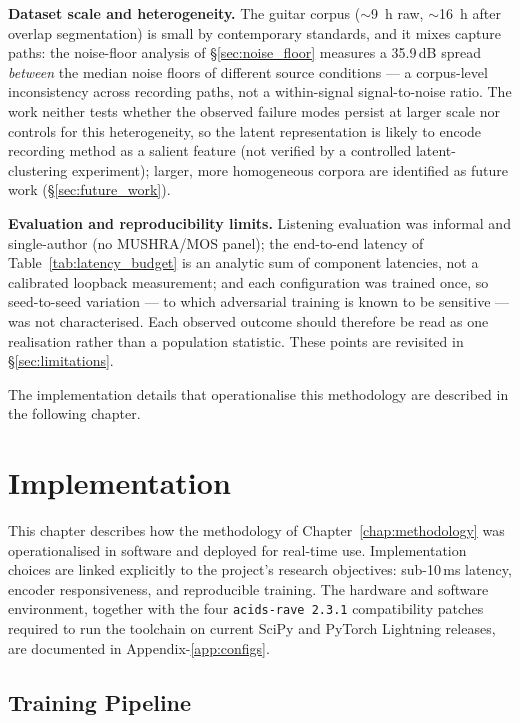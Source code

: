 \documentclass[a4paper,11pt,oneside,openany]{book}
\begin{document}
\textbf{Dataset scale and heterogeneity.} The guitar corpus ($\sim$9~h raw, $\sim$16~h after overlap segmentation) is small by contemporary standards, and it mixes capture paths: the noise-floor analysis of \S\ref{sec:noise_floor} measures a 35.9\,dB spread \emph{between} the median noise floors of different source conditions --- a corpus-level inconsistency across recording paths, not a within-signal signal-to-noise ratio. The work neither tests whether the observed failure modes persist at larger scale nor controls for this heterogeneity, so the latent representation is likely to encode recording method as a salient feature (not verified by a controlled latent-clustering experiment); larger, more homogeneous corpora are identified as future work (\S\ref{sec:future_work}).

\textbf{Evaluation and reproducibility limits.} Listening evaluation was informal and single-author (no MUSHRA/MOS panel); the end-to-end latency of Table~\ref{tab:latency_budget} is an analytic sum of component latencies, not a calibrated loopback measurement; and each configuration was trained once, so seed-to-seed variation --- to which adversarial training is known to be sensitive --- was not characterised. Each observed outcome should therefore be read as one realisation rather than a population statistic. These points are revisited in \S\ref{sec:limitations}.

The implementation details that operationalise this methodology are described in the following chapter.

\chapter{Implementation}\label{chap:implementation}

This chapter describes how the methodology of Chapter~\ref{chap:methodology} was operationalised in software and deployed for real-time use. Implementation choices are linked explicitly to the project's research objectives: sub-10\,ms latency, encoder responsiveness, and reproducible training. The hardware and software environment, together with the four \texttt{acids-rave 2.3.1} compatibility patches required to run the toolchain on current SciPy and PyTorch Lightning releases, are documented in Appendix-\ref{app:configs}.

\section{Training Pipeline}\label{sec:training_pipeline}
\end{document}
